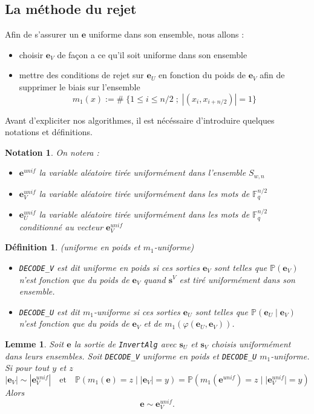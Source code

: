 \documentclass[12pt]{article}
\theoremstyle{plain}
\newtheorem{lemme}[thm]{Lemme}
\newtheorem{defi}[thm]{Définition}
\newtheorem{nota}[thm]{Notation}
\newcommand{\F}{\mathbb{F}}
\newcommand{\e}{\mathbf{e}}
\begin{document}
\subsection{La méthode du rejet}
Afin de s'assurer un $\mathbf{e}$ uniforme dans son ensemble, nous allons :
\begin{itemize}
\item choisir $\mathbf{e}_V$ de façon a ce qu'il soit uniforme dans son ensemble 
\item mettre des conditions de rejet sur $\mathbf{e}_U$ en fonction du poids de $\mathbf{e}_V$ afin de supprimer le biais sur l'ensemble 
$$ m_1(x) := \# \; \{1  \leq i \leq n/2 \;;\; |(x_i, x_{i+n/2})| = 1\}$$
\end{itemize}
Avant d'expliciter nos algorithmes, il est nécéssaire d'introduire quelques notations et définitions. \\

\begin{nota} On notera :
\begin{itemize}
\item $\mathbf{e}^{unif}$ la variable aléatoire tirée uniformément dans l'ensemble $S_{w,n}$
\item $\mathbf{e}_V^{unif}$ la variable aléatoire tirée uniformément dans les mots de $\F_q^{n/2}$ 
\item $\mathbf{e}_U^{unif}$ la variable aléatoire tirée uniformément dans les mots de $\F_q^{n/2}$ conditionné au vecteur $\e_V^{unif}$
\end{itemize}
\end{nota}


\begin{defi} (uniforme en poids et $m_1$-uniforme)
\begin{itemize}
\item \verb|DECODE_V| est dit uniforme en poids si ces sorties $\mathbf{e}_V$ sont telles que $\mathbb{P}(\mathbf{e}_V)$ n'est fonction que du poids de $\mathbf{e}_V$ quand $\mathbf{s}^V$ est tiré uniformément dans son ensemble.
\item \verb|DECODE_U| est dit $m_1$-uniforme si ces sorties $\mathbf{e}_U$ sont telles que $\mathbb{P}(\mathbf{e}_U\; |\;  \mathbf{e}_V)$ n'est fonction que du poids de $\mathbf{e}_V$ et de $m_1(\varphi(\mathbf{e}_U,\mathbf{e}_V))$.
\end{itemize}
\end{defi}

\begin{lemme} Soit $\mathbf{e}$ la sortie de \verb|InvertAlg| avec $\mathbf{s}_U$ et $\mathbf{s}_V$ choisis uniformément dans leurs ensembles. Soit \verb|DECODE_V| uniforme en poids et \verb|DECODE_U| $m_1$-uniforme. Si pour tout $y$ et $z$ 
$$|\mathbf{e}_V| \sim |\mathbf{e}_V^{unif}|\quad \text{et} \quad\mathbb{P}(m_1(\mathbf{e}) = z\; |\; |\mathbf{e}_V| = y) = \mathbb{P}(m_1(\mathbf{e}^{unif}) = z\; |\; |\mathbf{e}_V^{unif}| = y)$$
Alors
$$ \mathbf{e} \sim \mathbf{e}_V^{unif}.$$
\end{lemme}
\end{document}
